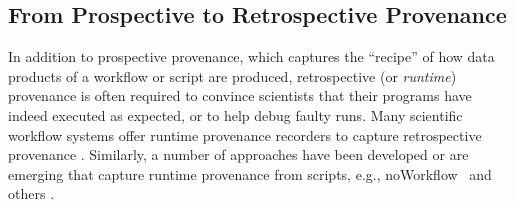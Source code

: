 \documentclass[letterpaper,twocolumn,10pt]{article}
\newcommand{\NW}{\textsf{noWorkflow}}
\begin{document}
\subsection*{From Prospective to Retrospective Provenance} 
In addition to prospective provenance, which captures the ``recipe''
of how data products of a workflow or script are produced,
retrospective (or \emph{runtime}) provenance is often required to
convince scientists that their programs have indeed executed as
expected, or to help debug faulty runs.  Many scientific workflow
systems offer runtime provenance recorders to capture retrospective
provenance
\cite{altintas2006provenance,davidson2007provenance,bowers2008kepler}. Similarly,
a number of approaches have been developed or are emerging that
capture runtime provenance from scripts, e.g., \NW\
\cite{murta2014nw} and others \cite{gandrud2013reproducible}.
\end{document}

